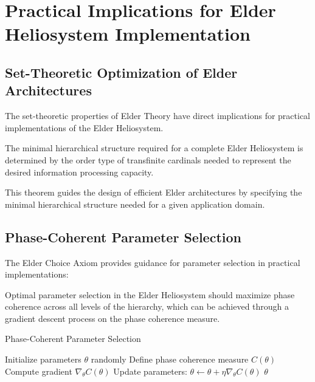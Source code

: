 \section{Practical Implications for Elder Heliosystem Implementation}

\subsection{Set-Theoretic Optimization of Elder Architectures}

The set-theoretic properties of Elder Theory have direct implications for practical implementations of the Elder Heliosystem.

\begin{theorem}
The minimal hierarchical structure required for a complete Elder Heliosystem is determined by the order type of transfinite cardinals needed to represent the desired information processing capacity.
\end{theorem}

This theorem guides the design of efficient Elder architectures by specifying the minimal hierarchical structure needed for a given application domain.

\subsection{Phase-Coherent Parameter Selection}

The Elder Choice Axiom provides guidance for parameter selection in practical implementations:

\begin{proposition}
Optimal parameter selection in the Elder Heliosystem should maximize phase coherence across all levels of the hierarchy, which can be achieved through a gradient descent process on the phase coherence measure.
\end{proposition}

\begin{algorithm}[h]
\caption{Phase-Coherent Parameter Selection}
\begin{algorithmic}[1]
\State Initialize parameters $\theta$ randomly
\State Define phase coherence measure $C(\theta)$
\State Compute gradient $\nabla_{\theta} C(\theta)$
\State Update parameters: $\theta \leftarrow \theta + \eta \nabla_{\theta} C(\theta)$
\EndWhile
\State \Return $\theta$
\end{algorithmic}
\end{algorithm}

